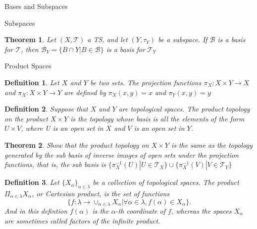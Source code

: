 \documentclass[12pt]{article}
\newtheorem{definition}{Definition}[section]
\newtheorem{theorem}{Theorem}[section]
\begin{document}
\begin{section}{Bases and Subspaces}
\begin{subsection}{Subspaces}
\begin{theorem}
Let $\left(X, \mathcal{T}\right)$ a TS, and let $\left(Y, \tau_{Y} \right)$ be a subspace. If $\mathcal{B}$ is a basis for $\mathcal{T}$, then $\mathcal{B}_{Y} = \{B\cap Y | B \in \mathcal{B} \}$ is a basis for $\mathcal{T}_{Y}$
\end{theorem}
\end{subsection}

\begin{subsection}{Product Spaces}

\begin{definition}
Let $X$ and $Y$ be two sets. The projection functions $\pi_{X}:X\times Y\rightarrow X$ and $\pi_{X}:X\times Y\rightarrow Y$ are defined by $\pi_{X}(x,y) = x$ and $\pi_{Y}(x,y) = y$
\end{definition}

\begin{definition}
Suppose that $X$ and $Y$ are topological spaces. The product topology on the product $X\times Y$ is the topology whose basis is all the elements of the form $U\times V$, where U is an open set in $X$ and $V$ is an open set in $Y$.
\end{definition}

\begin{theorem}
Show that the product topology on $X\times Y$ is the same as the topology generated by the sub basis of inverse images of open sets under the projection functions, that is, the sub basis is $\{ \pi_{X}^{-1}(U) | U\in\mathcal{T}_{X} \}\cup \{ \pi_{X}^{-1}(V) | V\in\mathcal{T}_{Y} \}$
\end{theorem}

\begin{definition}
Let $\{ X_{\alpha}\}_{\alpha\in\lambda}$ be a collection of topological spaces. The product $\Pi_{\alpha\in\lambda}X_{\alpha}$, or Cartesian product, is the set of functions 
$$
\{ f:\lambda\rightarrow\cup_{\alpha\in\lambda}X_{\alpha} | \forall \alpha\in\lambda, f(\alpha)\in X_{\alpha} \}.
$$
And in this defintion $f(\alpha)$ is the $\alpha$-th coordinate of $f$, whereas the spaces $X_{\alpha}$ are sometimes called factors of the infinite product.
\end{definition}

\end{subsection}
\end{section}
\end{document}
